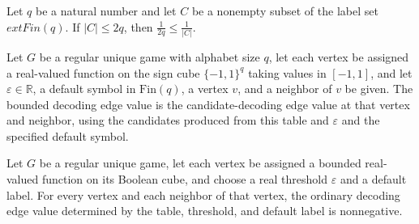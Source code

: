 \begin{theorem}
\label{FABL.RegularUniqueGame.one_div_two_mul_q_le_inv_card}
\leanok
{}
Let $q$ be a natural number and let $C$ be a nonempty subset of the label set
$	ext{Fin}(q)$. If $|C|\le 2q$, then $\frac{1}{2q}\le \frac{1}{|C|}$.
\end{theorem}

\begin{definition}
\label{FABL.RegularUniqueGame.boundedOrdinaryDecodingEdgeValue}
\leanok
{}
Let $G$ be a regular unique game with alphabet size $q$, let each vertex be assigned a
real-valued function on the sign cube $\{-1,1\}^q$ taking values in $[-1,1]$, and let
$\varepsilon\in\mathbb R$, a default symbol in $\mathrm{Fin}(q)$, a vertex $v$, and
a neighbor of $v$ be given. The bounded decoding edge value is the candidate-decoding
edge value at that vertex and neighbor, using the candidates produced from this table
and $\varepsilon$ and the specified default symbol.
\end{definition}

\begin{theorem}
\label{FABL.RegularUniqueGame.boundedOrdinaryDecodingEdgeValue_nonneg}
\leanok
{}
Let $G$ be a regular unique game, let each vertex be assigned a bounded real-valued
function on its Boolean cube, and choose a real threshold $\varepsilon$ and a default
label. For every vertex and each neighbor of that vertex, the ordinary decoding edge
value determined by the table, threshold, and default label is nonnegative.
\end{theorem}

